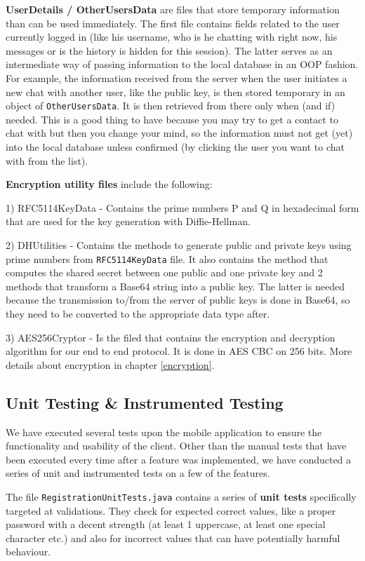 \textbf{UserDetails / OtherUsersData} are files that store temporary information than can be used immediately. The first file contains fields related to the user currently logged in (like his username, who is he chatting with right now, his messages or is the history is hidden for this session). The latter serves as an intermediate way of passing information to the local database in an OOP fashion. For example, the information received from the server when the user initiates a new chat with another user, like the public key, is then stored temporary in an object of \verb|OtherUsersData|. It is then retrieved from there only when (and if) needed. This is a good thing to have because you may try to get a contact to chat with but then you change your mind, so the information must not get (yet) into the local database unless confirmed (by clicking the user you want to chat with from the list).

\textbf{Encryption utility files} include the following:

1) RFC5114KeyData - Contains the prime numbers P and Q in hexadecimal form that are used for the key generation with Diffie-Hellman.

2) DHUtilities - Contains the methods to generate public and private keys using prime numbers from \verb|RFC5114KeyData| file. It also contains the method that computes the shared secret between one public and one private key and 2 methods that transform a Base64 string into a public key. The latter is needed because the transmission to/from the server of public keys is done in Base64, so they need to be converted to the appropriate data type after.

3) AES256Cryptor - Is the filed that contains the encryption and decryption algorithm for our end to end protocol. It is done in AES CBC on 256 bits. More details about encryption in chapter \ref{encryption}.

\subsection{Unit Testing \& Instrumented Testing}
\label{android_unit_instrumented_testing}

We have executed several tests upon the mobile application to ensure the functionality and usability of the client. Other than the manual tests that have been executed every time after a feature was implemented, we have conducted a series of unit and instrumented tests on a few of the features.

The file \verb|RegistrationUnitTests.java| contains a series of \textbf{unit tests} specifically targeted at validations. They check for expected correct values, like a proper password with a decent strength (at least 1 uppercase, at least one special character etc.) and also for incorrect values that can have potentially harmful behaviour.

